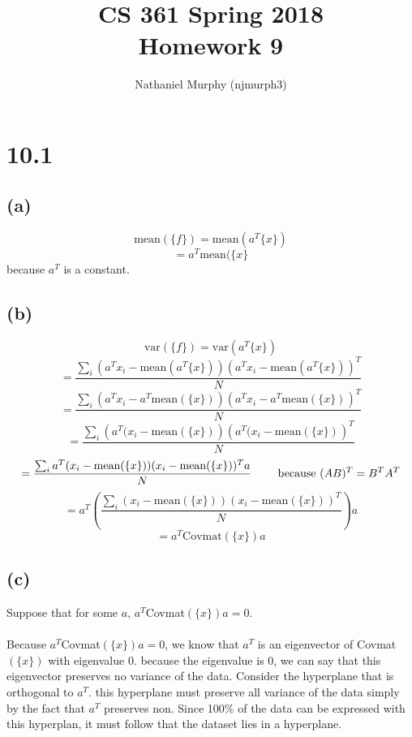 \documentclass[11pt]{article}
\title{\textbf{CS 361 Spring 2018\\Homework 9}}
\author{Nathaniel Murphy (njmurph3)}
\date{}
\newcommand{\mean}{\text{mean}}
\newcommand{\var}{\text{var}}
\begin{document}
\maketitle
\section*{10.1}
\subsection*{(a)}
\[\text{mean}(\{f\})=\text{mean}(a^T\{x\})\]
\[=a^T\text{mean}(\{x\}\]
because $a^T$ is a constant.
\subsection*{(b)}
\[\var(\{f\})=\var(a^T\{x\})\]
\[=\frac{\sum_i\left(a^Tx_i-\mean(a^T\{x\})\right)\left(a^Tx_i-\mean(a^T\{x\})\right)^T}{N}\]
\[=\frac{\sum_i\left(a^Tx_i-a^T\mean(\{x\})\right)\left(a^Tx_i-a^T\mean(\{x\})\right)^T}{N}\]
\[=\frac{\sum_i\left(a^T(x_i-\mean(\{x\})\right)\left(a^T(x_i-\mean(\{x\})\right)^T}{N}\]
\[=\frac{\sum_ia^T(x_i-\mean(\{x\}))(x_i-\mean(\{x\}))^Ta}{N}\hspace{7mm}\text{ because }(AB)^T=B^TA^T\]
\[=a^T\left(\frac{\sum_i(x_i-\mean(\{x\}))(x_i-\mean(\{x\}))^T}{N}\right)a\]
\[=a^T\text{Covmat}(\{x\})a\]
\subsection*{(c)}
Suppose that for some $a$, $a^T$Covmat$(\{x\})a=0$. \\ \\
Because $a^T$Covmat$(\{x\})a=0$, we know that $a^T$ is an eigenvector of Covmat$(\{x\})$ with eigenvalue 0. because the eigenvalue is 0, we can say that this eigenvector preserves no variance of the data. Consider the hyperplane that is orthogonal to $a^T$. this hyperplane must preserve all variance of the data simply by the fact that $a^T$ preserves non. Since 100\% of the data can be expressed with this hyperplan, it must follow that the dataset lies in a hyperplane.
\clearpage
\end{document}
